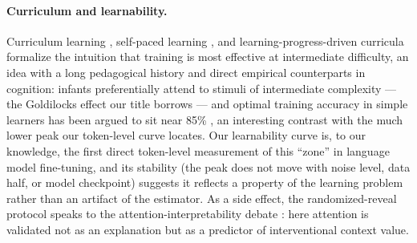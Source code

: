 \documentclass{article} %
\begin{document}

\paragraph{Curriculum and learnability.} Curriculum learning \citep{bengio2009curriculum}, self-paced learning \citep{kumar2010self}, and learning-progress-driven curricula \citep{graves2017automated} formalize the intuition that training is most effective at intermediate difficulty, an idea with a long pedagogical history \citep{vygotsky1978mind} and direct empirical counterparts in cognition: infants preferentially attend to stimuli of intermediate complexity \citep{kidd2012goldilocks} --- the Goldilocks effect our title borrows --- and optimal training accuracy in simple learners has been argued to sit near 85\% \citep{wilson2019eighty}, an interesting contrast with the much lower peak our token-level curve locates. Our learnability curve is, to our knowledge, the first direct token-level measurement of this ``zone'' in language model fine-tuning, and its stability (the peak does not move with noise level, data half, or model checkpoint) suggests it reflects a property of the learning problem rather than an artifact of the estimator. As a side effect, the randomized-reveal protocol speaks to the attention-interpretability debate \citep{jain2019attention}: here attention is validated not as an explanation but as a predictor of interventional context value.
\end{document}
